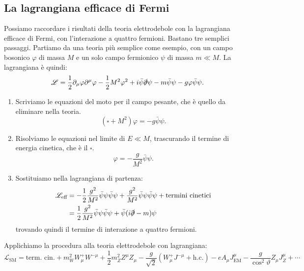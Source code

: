 \documentclass[italian,a4paper]{article}
\theoremstyle{definition}
\newcommand{\lagr}{\ensuremath{\mathscr{L}}}
\renewcommand{\theta}{\vartheta}
\begin{document}
\subsection{La lagrangiana efficace di Fermi}
Possiamo raccordare i risultati della teoria elettrodebole con la
lagrangiana efficace di Fermi, con l'interazione a quattro fermioni. Bastano
tre semplici passaggi.
Partiamo da una teoria pi\`u semplice come esempio, con un campo bosonico
$\varphi$ di massa $M$ e un solo campo fermionico $\psi$ di massa $m \ll M$.
La lagrangiana \`e quindi:
\begin{equation*}
    \lagr = \dfrac{1}{2}\partial_\mu \varphi \partial^\mu \varphi -
    \dfrac{1}{2}M^2 \varphi^2 + i \bar{\psi}\slashed{\partial} \psi
    - m \bar{\psi}\psi - g \varphi \bar{\psi} \psi.
\end{equation*}
\begin{enumerate}
    \item Scriviamo le equazioni del moto per il campo pesante, che \`e
        quello da eliminare nella teoria.
        \begin{equation*}
            (\square + M^2) \varphi = -g \bar{\psi} \psi.
        \end{equation*}
    \item Risolviamo le equazioni nel limite di $E \ll M$, trascurando il
        termine di energia cinetica, che \`e il $\square$.
        \begin{equation*}
            \varphi = -\dfrac{g}{M^2}\bar{\psi}\psi.
        \end{equation*}
    \item Sostituiamo nella lagrangiana di partenza:
        \begin{align*}
            \lagr_{\text{eff}} &= -\dfrac{1}{2}
            \dfrac{g^2}{M^2}
            \bar{\psi}\psi \bar{\psi}\psi
            +
            \dfrac{g^2}{M^2}
            \bar{\psi}\psi \bar{\psi}\psi
            + \text{termini cinetici}\\
            &= \dfrac{1}{2}
            \dfrac{g^2}{M^2}
            \bar{\psi}\psi \bar{\psi}\psi
            + \bar{\psi}(i\slashed{\partial} - m) \psi
        \end{align*}
        trovando quindi il termine di interazione a quattro fermioni.
\end{enumerate}
Applichiamo la procedura alla teoria elettrodebole con lagrangiana:
\begin{equation*}
    \lagr_{\text{SM}} = \text{term. cin.} + m_W^2 W_\mu^+
    W^{-\mu} + \dfrac{1}{2}m_Z^2 Z^\mu Z_\mu
    - \dfrac{g}{\sqrt{2}}(W^{+}_\mu J^{-\mu} + \text{h.c.})
    - e A_\mu J^\mu_{\text{EM}}
    - \dfrac{g}{\cos^2 \theta} Z_\mu J_Z^\mu
    + \cdots
\end{equation*}
\end{document}

